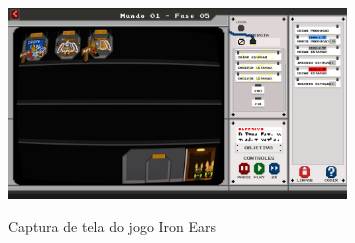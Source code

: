 \begin{figure}[H]
	\centering
	\caption{Captura de tela do jogo Iron Ears}
	\includegraphics[width=0.8\textwidth]{images/iron-ears.png}
	\label{fig:ie}
\end{figure}
